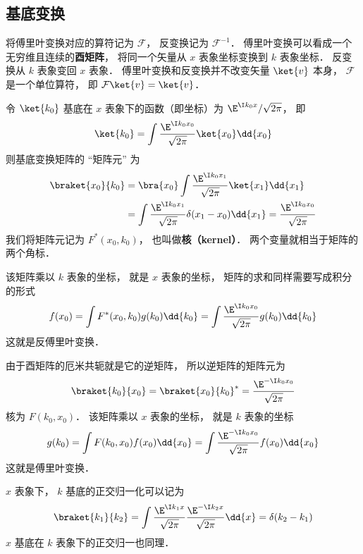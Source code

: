 \subsection{基底变换}

将傅里叶变换对应的算符记为 $\mathcal F$， 反变换记为 $\mathcal F^{-1}$． 傅里叶变换可以看成一个无穷维且连续的\textbf{酉矩阵}， 将同一个矢量从 $x$ 表象坐标变换到 $k$ 表象坐标． 反变换从 $k$ 表象变回 $x$ 表象． 傅里叶变换和反变换并不改变矢量 $\ket{v}$ 本身， $\mathcal F$ 是一个单位算符， 即 $\mathcal F \ket{v} = \ket{v}$．

令 $\ket{k_0}$ 基底在 $x$ 表象下的函数（即坐标）为 $\E^{\I k_0 x}/\sqrt{2\pi }$， 即
\begin{equation}
\ket{k_0} = \int \frac{\E^{\I k_0 x_0}}{\sqrt{2\pi }} \ket{x_0} \dd{x_0}
\end{equation}
则基底变换矩阵的 “矩阵元” 为
\begin{equation}
\begin{aligned}
\braket{x_0}{k_0} &= \bra{x_0}\int \frac{\E^{\I k_0 x_1}}{\sqrt{2\pi }} \ket{x_1} \dd{x_1}\\
&= \int \frac{\E^{\I k_0 x_1}}{\sqrt{2\pi }} \delta (x_1 - x_0) \dd{x_1}
= \frac{\E^{\I k_0 x_0}}{\sqrt{2\pi }}
\end{aligned}
\end{equation}
我们将矩阵元记为 $F^*(x_0, k_0)$， 也叫做\textbf{核（kernel）}． 两个变量就相当于矩阵的两个角标．

该矩阵乘以 $k$ 表象的坐标， 就是 $x$ 表象的坐标， 矩阵的求和同样需要写成积分的形式
\begin{equation}
f(x_0) = \int F^*(x_0, k_0) g(k_0) \dd{k_0} = \int \frac{\E^{\I k_0 x_0}}{\sqrt{2\pi }} g(k_0) \dd{k_0}
\end{equation}
这就是反傅里叶变换．

由于酉矩阵的厄米共轭就是它的逆矩阵， 所以逆矩阵的矩阵元为
\begin{equation}
\braket{k_0}{x_0} = \braket{x_0}{k_0}^* = \frac{\E^{-\I k_0 x_0}}{\sqrt{2\pi }}
\end{equation}
核为 $F(k_0, x_0)$． 该矩阵乘以 $x$ 表象的坐标， 就是 $k$ 表象的坐标
\begin{equation}
g(k_0) = \int F(k_0, x_0) f(x_0) \dd{x_0} = \int \frac{\E^{-\I k_0 x_0}}{\sqrt{2\pi }} f(x_0) \dd{x_0}
\end{equation}
这就是傅里叶变换．

$x$ 表象下， $k$ 基底的正交归一化可以记为
\begin{equation}\label{FTvec_eq1}
\braket{k_1}{k_2} = \int \frac{\E^{\I k_1 x}}{\sqrt{2\pi }} \frac{\E^{-\I k_2 x}}{\sqrt{2\pi }} \dd{x} = \delta (k_2 - k_1)
\end{equation}
$x$ 基底在 $k$ 表象下的正交归一也同理．

